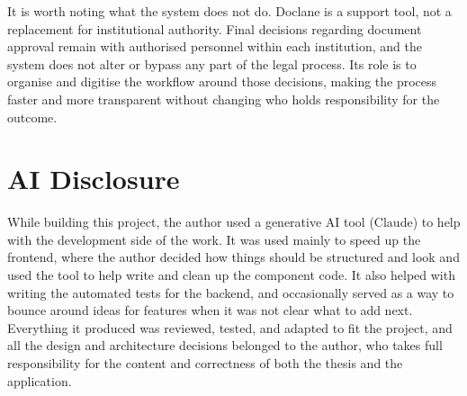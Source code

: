 \par It is worth noting what the system does not do. Doclane is a support tool, not a replacement for institutional authority. Final decisions regarding document approval remain with authorised personnel within each institution, and the system does not alter or bypass any part of the legal process. Its role is to organise and digitise the workflow around those decisions, making the process faster and more transparent without changing who holds responsibility for the outcome.

\section{AI Disclosure}

While building this project, the author used a generative AI tool (Claude) to help with the development side of the work. It was used mainly to speed up the frontend, where the author decided how things should be structured and look and used the tool to help write and clean up the component code. It also helped with writing the automated tests for the backend, and occasionally served as a way to bounce around ideas for features when it was not clear what to add next. Everything it produced was reviewed, tested, and adapted to fit the project, and all the design and architecture decisions belonged to the author, who takes full responsibility for the content and correctness of both the thesis and the application.

